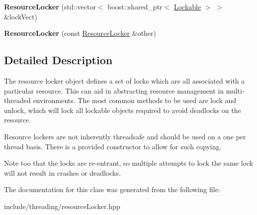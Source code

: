 \begin{DoxyCompactItemize}
\item 
\hypertarget{classcore_1_1threading_1_1_resource_locker_a5720cd1e4fd0171fb0c2e69b742a6121}{{\bfseries Resource\-Locker} (std\-::vector$<$ boost\-::shared\-\_\-ptr$<$ \hyperlink{classcore_1_1threading_1_1_lockable}{Lockable} $>$ $>$ \&lock\-Vect)}\label{classcore_1_1threading_1_1_resource_locker_a5720cd1e4fd0171fb0c2e69b742a6121}

\item 
\hypertarget{classcore_1_1threading_1_1_resource_locker_a616014044522d39c3997533bd089199e}{{\bfseries Resource\-Locker} (const \hyperlink{classcore_1_1threading_1_1_resource_locker}{Resource\-Locker} \&other)}\label{classcore_1_1threading_1_1_resource_locker_a616014044522d39c3997533bd089199e}

\end{DoxyCompactItemize}


\subsection{Detailed Description}
The resource locker object defines a set of locks which are all associated with a particular resource. This can aid in abstracting resource management in multi-\/threaded environments. The most common methods to be used are lock and unlock, which will lock all lockable objects required to avoid deadlocks on the resource.

Resource lockers are not inherently threadsafe and should be used on a one per thread basis. There is a provided constructor to allow for such copying.

Note too that the locks are re-\/entrant, so multiple attempts to lock the same lock will not result in crashes or deadlocks. 

The documentation for this class was generated from the following file\-:\begin{DoxyCompactItemize}
\item 
include/threading/resource\-Locker.\-hpp\end{DoxyCompactItemize}
